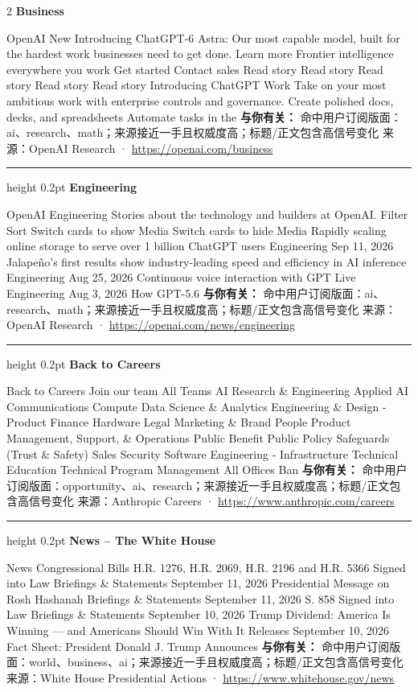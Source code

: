 \documentclass[10.5pt]{ctexart}
\begin{document}
\begin{multicols}{2}
{\large\bfseries Business}\par
OpenAI New Introducing ChatGPT-6 Astra: Our most capable model, built for the hardest work businesses need to get done. Learn more Frontier intelligence everywhere you work Get started Contact sales Read story Read story Read story Read story Read story Introducing ChatGPT Work Take on your most ambitious work with enterprise controls and governance. Create polished docs, decks, and spreadsheets Automate tasks in the
\textbf{与你有关：} 命中用户订阅版面：ai、research、math；来源接近一手且权威度高；标题/正文包含高信号变化
{\footnotesize\color{ormuted} 来源：OpenAI Research · \url{https://openai.com/business}}
\vspace{2mm}
\hrule height 0.2pt
\vspace{2mm}
{\large\bfseries Engineering}\par
OpenAI Engineering Stories about the technology and builders at OpenAI. Filter Sort Switch cards to show Media Switch cards to hide Media Rapidly scaling online storage to serve over 1 billion ChatGPT users Engineering Sep 11, 2026 Jalapeño’s first results show industry-leading speed and efficiency in AI inference Engineering Aug 25, 2026 Continuous voice interaction with GPT Live Engineering Aug 3, 2026 How GPT-5.6 
\textbf{与你有关：} 命中用户订阅版面：ai、research、math；来源接近一手且权威度高；标题/正文包含高信号变化
{\footnotesize\color{ormuted} 来源：OpenAI Research · \url{https://openai.com/news/engineering}}
\vspace{2mm}
\hrule height 0.2pt
\vspace{2mm}
{\large\bfseries Back to Careers}\par
Back to Careers Join our team All Teams AI Research \& Engineering Applied AI Communications Compute Data Science \& Analytics Engineering \& Design - Product Finance Hardware Legal Marketing \& Brand People Product Management, Support, \& Operations Public Benefit Public Policy Safeguards (Trust \& Safety) Sales Security Software Engineering - Infrastructure Technical Education Technical Program Management All Offices Ban
\textbf{与你有关：} 命中用户订阅版面：opportunity、ai、research；来源接近一手且权威度高；标题/正文包含高信号变化
{\footnotesize\color{ormuted} 来源：Anthropic Careers · \url{https://www.anthropic.com/careers}}
\vspace{2mm}
\hrule height 0.2pt
\vspace{2mm}
{\large\bfseries News – The White House}\par
News Congressional Bills H.R. 1276, H.R. 2069, H.R. 2196 and H.R. 5366 Signed into Law Briefings \& Statements September 11, 2026 Presidential Message on Rosh Hashanah Briefings \& Statements September 11, 2026 S. 858 Signed into Law Briefings \& Statements September 10, 2026 Trump Dividend: America Is Winning — and Americans Should Win With It Releases September 10, 2026 Fact Sheet: President Donald J. Trump Announces 
\textbf{与你有关：} 命中用户订阅版面：world、business、ai；来源接近一手且权威度高；标题/正文包含高信号变化
{\footnotesize\color{ormuted} 来源：White House Presidential Actions · \url{https://www.whitehouse.gov/news}}
\end{multicols}
\end{document}
